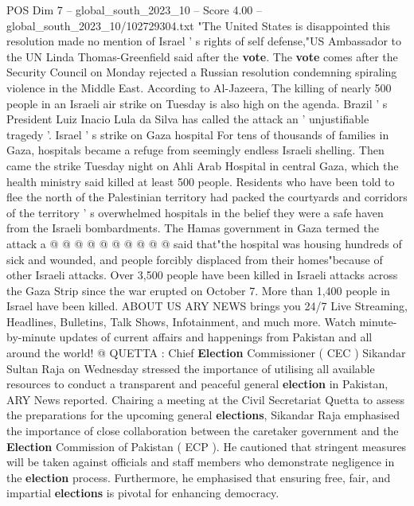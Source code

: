 \begin{textsample}{POS Dim 7 – global\_south\_2023\_10 – Score 4.00 – global\_south\_2023\_10/102729304.txt}  \label{ex:f7_pos_394}
"The United States is disappointed this resolution made no mention of Israel ' s rights of self defense,"US Ambassador to the UN Linda Thomas-Greenfield said after the \textbf{vote}.
The \textbf{vote} comes after the Security Council on Monday rejected a Russian resolution condemning spiraling violence in the Middle East.
According to Al-Jazeera, The killing of nearly 500 people in an Israeli air strike on Tuesday is also high on the agenda.
Brazil ' s President Luiz Inacio Lula da Silva has called the attack an ' unjustifiable tragedy '.
Israel ' s strike on Gaza hospital For tens of thousands of families in Gaza, hospitals became a refuge from seemingly endless Israeli shelling.
Then came the strike Tuesday night on Ahli Arab Hospital in central Gaza, which the health ministry said killed at least 500 people.
Residents who have been told to flee the north of the Palestinian territory had packed the courtyards and corridors of the territory ' s overwhelmed hospitals in the belief they were a safe haven from the Israeli bombardments.
The Hamas government in Gaza termed the attack a @ @ @ @ @ @ @ @ @ @ said that"the hospital was housing hundreds of sick and wounded, and people forcibly displaced from their homes"because of other Israeli attacks.
Over 3,500 people have been killed in Israeli attacks across the Gaza Strip since the war erupted on October 7.
More than 1,400 people in Israel have been killed.
ABOUT US ARY NEWS brings you 24/7 Live Streaming, Headlines, Bulletins, Talk Shows, Infotainment, and much more.
Watch minute-by-minute updates of current affairs and happenings from Pakistan and all around the world! @ QUETTA : Chief \textbf{Election} Commissioner ( CEC ) Sikandar Sultan Raja on Wednesday stressed the importance of utilising all available resources to conduct a transparent and peaceful general \textbf{election} in Pakistan, ARY News reported.
Chairing a meeting at the Civil Secretariat Quetta to assess the preparations for the upcoming general \textbf{elections}, Sikandar Raja emphasised the importance of close collaboration between the caretaker government and the \textbf{Election} Commission of Pakistan ( ECP ).
He cautioned that stringent measures will be taken against officials and staff members who demonstrate negligence in the \textbf{election} process.
Furthermore, he emphasised that ensuring free, fair, and impartial \textbf{elections} is pivotal for enhancing democracy.

\end{textsample}
